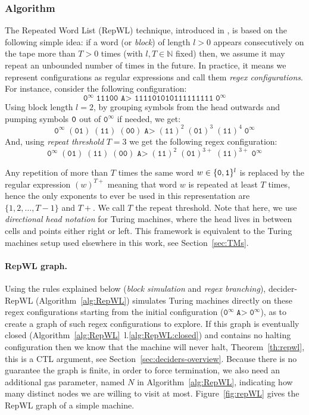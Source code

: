 \subsubsection{Algorithm}

The Repeated Word List (RepWL) technique, introduced in \CoqBB, is based on the following simple idea: if a word (or \textit{block}) of length $l > 0$ appears consecutively on the tape more than $T > 0$ times (with $l, T \in \mathbb{N}$ fixed) then, we assume it may repeat an unbounded number of times in the future. In practice, it means we represent configurations as regular expressions and call them \textit{regex configurations}. For instance, consider the following configuration:
$$ \texttt{0}^\infty \; \texttt{11100 A> 111101010111111111} \; \texttt{0}^\infty$$
Using block length $l=2$, by grouping symbols from the head outwards and pumping symbols $\texttt{0}$ out of $\texttt{0}^\infty$ if needed, we get:
$$ \texttt{0}^\infty \; (\texttt{01}) \; (\texttt{11}) \; (\texttt{00}) \; \texttt{A>} \; (\texttt{11})^2 \; (\texttt{01})^{3} \; (\texttt{11})^{4} \; \texttt{0}^\infty $$
And, using \textit{repeat threshold} $T=3$ we get the following regex configuration:
$$ \texttt{0}^\infty \; (\texttt{01}) \; (\texttt{11}) \; (\texttt{00}) \; \texttt{A>} \; (\texttt{11})^2 \; (\texttt{01})^{3+} \; (\texttt{11})^{3+} \; \texttt{0}^\infty $$

Any repetition of more than $T$ times the same word $w \in \{\texttt{0},\texttt{1}\}^l$ is replaced by the regular expression $(w)^{T+}$ meaning that word $w$ is repeated at least $T$ times, hence the only exponents to ever be used in this representation are $\{1,2,\dots,T-1\}$ and $T+$. We call $T$ the repeat threshold. Note that here, we use \textit{directional head notation} for Turing machines, where the head lives in between cells and points either right or left. This framework is equivalent to the Turing machines setup used elsewhere in this work, see Section~\ref{sec:TMs}.

\paragraph{RepWL graph.} Using the rules explained below (\textit{block simulation} and \textit{regex branching}), {\sc decider-RepWL} (Algorithm~\ref{alg:RepWL}) simulates Turing machines directly on these regex configurations starting from the initial configuration (\ie $\texttt{0}^\infty \; \texttt{A>} \; \texttt{0}^\infty$), as to create a graph of such regex configurations to explore. If this graph is eventually closed (Algorithm~\ref{alg:RepWL}~l.\ref{alg:RepWL:closed}) and contains no halting configuration then we know that the machine will never halt, Theorem~\ref{th:repwl}, this is a CTL argument, see Section~\ref{sec:deciders-overview}. Because there is no guarantee the graph is finite, in order to force termination, we also need an additional gas parameter, named $N$ in Algorithm~\ref{alg:RepWL}, indicating how many distinct nodes we are willing to visit at most. Figure~\ref{fig:repWL} gives the RepWL graph of a simple machine.

